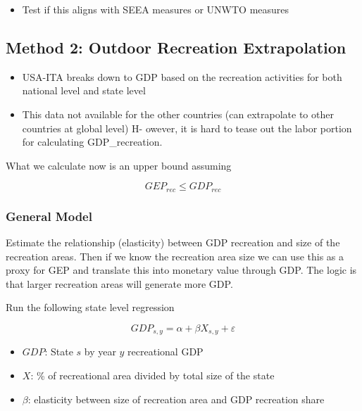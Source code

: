 \documentclass[
  letterpaper,
  DIV=11,
  numbers=noendperiod]{scrartcl}
\providecommand{\tightlist}{%
  \setlength{\itemsep}{0pt}\setlength{\parskip}{0pt}}\usepackage{longtable,booktabs,array}
\begin{document}
\begin{itemize}
\tightlist
\item
  Test if this aligns with SEEA measures or UNWTO measures
\end{itemize}

\hypertarget{method-2-outdoor-recreation-extrapolation}{%
\subsection{Method 2: Outdoor Recreation
Extrapolation}\label{method-2-outdoor-recreation-extrapolation}}

\begin{itemize}
\tightlist
\item
  USA-ITA breaks down to GDP based on the recreation activities for both
  national level and state level
\item
  This data not available for the other countries (can extrapolate to
  other countries at global level) H- owever, it is hard to tease out
  the labor portion for calculating GDP\_recreation.
\end{itemize}

What we calculate now is an upper bound assuming

\[
GEP_{rec} \le GDP_{rec}
\]

\hypertarget{general-model-1}{%
\subsubsection{General Model}\label{general-model-1}}

Estimate the relationship (elasticity) between GDP recreation and size
of the recreation areas. Then if we know the recreation area size we can
use this as a proxy for GEP and translate this into monetary value
through GDP. The logic is that larger recreation areas will generate
more GDP.

Run the following state level regression

\[
GDP_{s,y} = \alpha + \beta X_{s,y} + \varepsilon
\]

\begin{itemize}
\tightlist
\item
  \(GDP\): State \(s\) by year \(y\) recreational GDP
\item
  \(X\): \% of recreational area divided by total size of the state
\item
  \(\beta\): elasticity between size of recreation area and GDP
  recreation share
\end{itemize}
\end{document}
